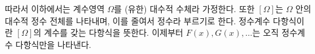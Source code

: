 
따라서 이하에서는 계수영역 $\Omega$를 (유한) 대수적 수체라 가정한다. 또한 $[\Omega]$는 $\Omega$ 안의 대수적 정수 전체를 나타내며, 이를 줄여서 정수라 부르기로 한다. 정수계수 다항식이란 $[\Omega]$의 계수를 갖는 다항식을 뜻한다. 이제부터 $F(x),G(x),\ldots$는 오직 정수계수 다항식만을 나타낸다.
